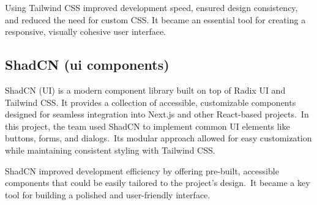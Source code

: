 Using Tailwind CSS improved development speed, ensured design consistency, and reduced the need for custom CSS. It became an essential tool for creating a responsive, visually cohesive user interface.

\subsection{ShadCN (ui components)}\label{subsec:shadcn-(ui-components)}

ShadCN (UI) is a modern component library built on top of Radix UI and Tailwind CSS. It provides a collection of accessible, customizable components designed for seamless integration into Next.js and other React-based projects.\ In this project, the team used ShadCN to implement common UI elements like buttons, forms, and dialogs.\ Its modular approach allowed for easy customization while maintaining consistent styling with Tailwind CSS\@.\cite[ShadCN]{shadcn}

ShadCN improved development efficiency by offering pre-built, accessible components that could be easily tailored to the project’s design.\ It became a key tool for building a polished and user-friendly interface.